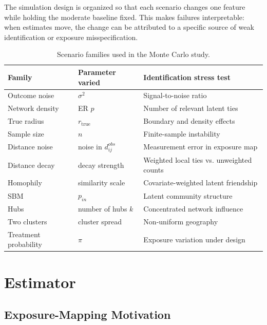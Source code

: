 \documentclass[11pt]{article}
\begin{document}
The simulation design is organized so that each scenario changes one feature while holding the moderate baseline fixed. This makes failures interpretable: when estimates move, the change can be attributed to a specific source of weak identification or exposure misspecification.

\begin{table}[H]
    \centering
    \caption{Scenario families used in the Monte Carlo study.}
    \small
    \begin{tabular}{lll}
        \toprule
        Family & Parameter varied & Identification stress test \\
        \midrule
        Outcome noise & $\sigma^2$ & Signal-to-noise ratio \\
        Network density & ER $p$ & Number of relevant latent ties \\
        True radius & $r_{\text{true}}$ & Boundary and density effects \\
        Sample size & $n$ & Finite-sample instability \\
        Distance noise & noise in $d^{obs}_{ij}$ & Measurement error in exposure map \\
        Distance decay & decay strength & Weighted local ties vs. unweighted counts \\
        Homophily & similarity scale & Covariate-weighted latent friendship \\
        SBM & $p_{in}$ & Latent community structure \\
        Hubs & number of hubs $k$ & Concentrated network influence \\
        Two clusters & cluster spread & Non-uniform geography \\
        Treatment probability & $\pi$ & Exposure variation under design \\
        \bottomrule
    \end{tabular}
    \label{tab:scenario_families}
\end{table}

\section{Estimator}

\subsection{Exposure-Mapping Motivation}
\end{document}
